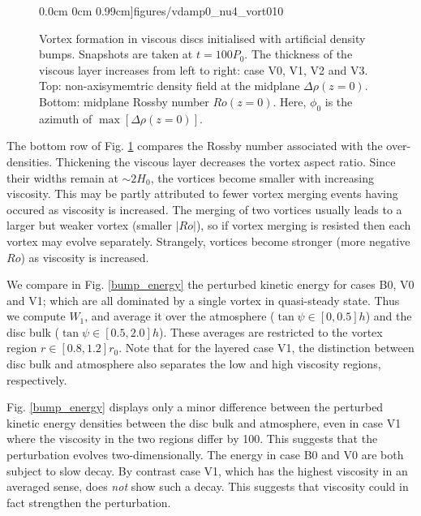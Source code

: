\begin{figure}
     0.0cm 0cm
     0.99cm]{figures/vdamp0_nu4_vort010}
   \caption{Vortex formation in viscous discs initialised with
     artificial density bumps. Snapshots are taken at $t=100P_0$. The
     thickness of the viscous layer increases from left to 
     right: case V0, V1, V2 and V3.   
     Top: non-axisymemtric density field at the midplane
     $\Delta\rho(z=0)$. Bottom: midplane Rossby number
     $Ro(z=0)$. Here, $\phi_0$ is the azimuth of $\max[\Delta\rho(z=0)]$. 
     \label{vdamp0}
   }
\end{figure}

The bottom row of Fig. \ref{vdamp0} compares the Rossby number
associated with the over-densities. Thickening the viscous 
layer decreases the vortex aspect ratio. Since their widths remain
at $\sim 2H_0$, the vortices become smaller with increasing
viscosity. This may be partly attributed to fewer vortex merging
events having occured as viscosity is increased. The merging of
two vortices usually leads to a larger but weaker vortex (smaller
$|Ro|$), so if vortex merging is resisted then each vortex may evolve
separately. Strangely, vortices become stronger  (more negative $Ro$)
as viscosity is increased.

We compare  in Fig. \ref{bump_energy} the perturbed kinetic energy for 
cases B0, V0 and V1; which are all dominated by a single vortex in 
quasi-steady state. Thus we compute $W_1$, and
average it over the atmosphere ($\tan{\psi}\in[0,0.5]h$) and the 
disc bulk ($\tan{\psi}\in[0.5,2.0]h$). These averages are restricted
to the vortex region $r\in[0.8,1.2]r_0$. Note that for the layered
case V1, the distinction between disc bulk and atmosphere also
separates the low and high viscosity regions, respectively. 

Fig. \ref{bump_energy} displays only a minor difference between the
perturbed kinetic energy densities between the disc bulk and
atmosphere, even in case V1 where the viscosity in the two regions
differ by 100. This suggests that the perturbation evolves
two-dimensionally. The energy in case B0 and V0 are both subject to
slow decay. By contrast case V1, which has the highest viscosity in an
averaged sense, does \emph{not} show such a decay. This suggests that
viscosity could in fact strengthen the perturbation. 

